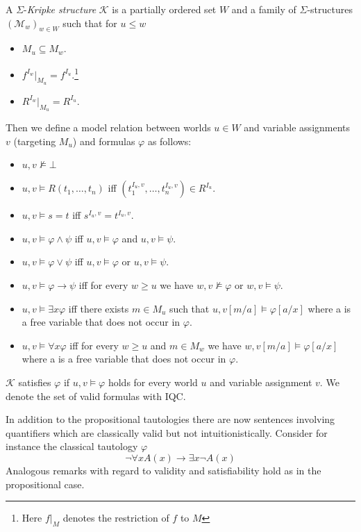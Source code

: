 \documentclass[a4paper,UKenglish,cleveref, autoref, thm-restate]{lipics-v2021}
\begin{document}
\begin{definition}
	A $\Sigma$-\textit{Kripke structure} $\mathcal{K}$ is a partially ordered set $W$ and a family of $\Sigma$-structures $(\mathcal{M}_w)_{w\in W}$ such that for $u\leq w$
	\begin{itemize}
		\item $M_u\subseteq M_w$.
		\item $f^{I_w}|_{M_u} = f^{I_u}$.\footnote{Here $f|_M$ denotes the restriction of $f$ to $M$}
		\item $R^{I_w}|_{M_u} = R^{I_u}$.
	\end{itemize}
	Then we define a model relation between worlds $u\in W$ and variable assignments $v$ (targeting $M_u$) and formulas $\varphi$ as follows:
	\begin{itemize}
		\item $u, v\not\models\bot$
		\item $u, v\models R(t_1,\dots,t_n)$ iff $(t_1^{I_u, v},\dots,t_n^{I_u, v})\in R^{I_u}$.
		\item $u, v\models s = t$ iff $s^{I_u, v} = t^{I_u, v}$.
		\item $u, v\models \varphi\wedge \psi$ iff $u, v\models\varphi$ and $u, v\models\psi$.
		\item $u, v\models \varphi\vee\psi$ iff $u, v\models\varphi$ or $u, v\models\psi$.
		\item $u, v\models \varphi\to\psi$ iff for every $w\geq u$ we have $w, v\not\models\varphi$ or $w, v\models\psi$.
		\item $u, v\models\exists x\varphi$ iff there exists $m\in M_u$ such that $u, v[m/a]\models\varphi[a/x]$ where a is a free variable that does not occur in $\varphi$.
		\item $u, v\models\forall x\varphi$ iff for every $w\geq u$ and $m\in M_w$ we have $w, v[m/a]\models\varphi[a/x]$ where a is a free variable that does not occur in $\varphi$.
	\end{itemize}
	$\mathcal{K}$ satisfies $\varphi$ if $u, v\models\varphi$ holds for every world $u$ and variable assignment $v$. We denote the set of valid formulas with IQC.
\end{definition}
In addition to the propositional tautologies there are now sentences involving quantifiers which are classically valid but not intuitionistically.
Consider for instance the classical tautology $\varphi$ $$\neg\forall x A(x)\to \exists x \neg A(x)$$Analogous remarks with regard to validity and satisfiability hold as in the propositional case.
\end{document}

